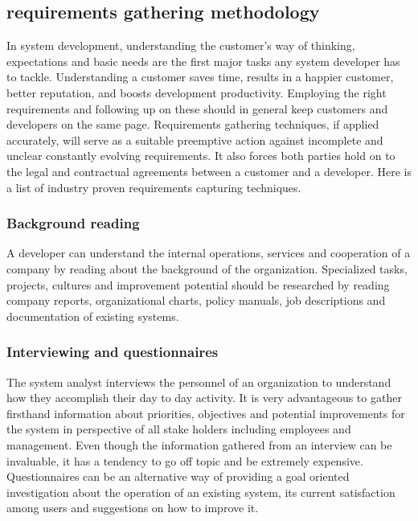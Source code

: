 \subsection{requirements gathering methodology}

In system development, understanding the customer's way of thinking,
expectations and basic needs are the first major tasks any system developer has to
tackle. Understanding a customer saves time, results in a happier customer,
better reputation, and boosts development productivity\cite{req:requirements-technique2}. Employing the right
requirements and following up on these should in general keep customers and
developers on the same page.
Requirements gathering techniques, if applied accurately, will serve as a
suitable preemptive action against incomplete and unclear constantly evolving
requirements. It also forces both parties hold on to the legal and
contractual agreements between a customer and a developer. Here is a list of
industry proven requirements capturing techniques\cite{req:requirements-technique}.

\subsubsection{Background reading}

A developer can understand the internal operations, services and cooperation of
a company by reading about the background of the organization. Specialized
tasks, projects, cultures and improvement potential should be
researched by reading company reports, organizational charts, policy manuals,
job descriptions and documentation of existing systems.

\subsubsection{Interviewing and questionnaires}

The system analyst interviews the personnel of an organization to understand how
they accomplish their day to day activity. It is very advantageous to gather
firsthand information about priorities, objectives and potential improvements
for the system in perspective of all stake holders including employees and
management. Even though the information gathered from an
interview can be invaluable, it has a tendency to go off topic and be
extremely expensive. Questionnaires can be an alternative way of providing
a goal oriented investigation about the operation of an existing system,
its current satisfaction among users and suggestions on how to improve it.

